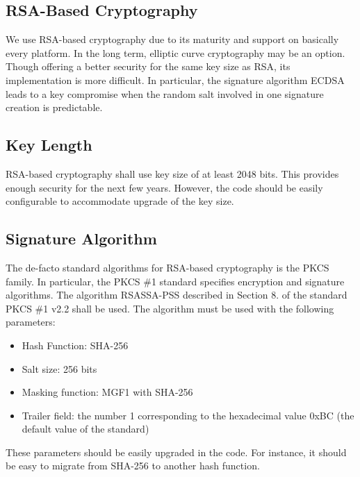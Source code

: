 \documentclass[a4paper,10pt]{article}
\begin{document}
\subsection{RSA-Based Cryptography}
We use RSA-based cryptography due to its maturity and support on basically every platform.  In the long term, elliptic curve cryptography may be an option. Though offering a 
better security for the same key size as RSA, its implementation is more difficult. In particular, the signature algorithm ECDSA leads to a key compromise when the random salt 
involved in one signature creation is predictable.

\subsection{Key Length}
RSA-based cryptography shall use key size of at least 2048 bits. This provides enough security for the next few years. However, the code should be easily configurable to 
accommodate upgrade of the key size.

\subsection{Signature Algorithm}
The de-facto standard algorithms for RSA-based cryptography is the PKCS family. In particular, the PKCS \#1 standard specifies encryption and signature algorithms. The algorithm 
\textsf{RSASSA-PSS} described in Section 8. of the standard PKCS \#1 v2.2 shall be used. The algorithm must be used with the following parameters:

\begin{itemize}
\item Hash Function: SHA-256
\item Salt size: 256 bits
\item Masking function: MGF1 with SHA-256
\item Trailer field: the number 1 corresponding to the hexadecimal value 0xBC (the default value of the standard)
\end{itemize}

These parameters should be easily upgraded in the code. For instance, it should be easy to migrate from SHA-256 to another hash function.



\end{document}
